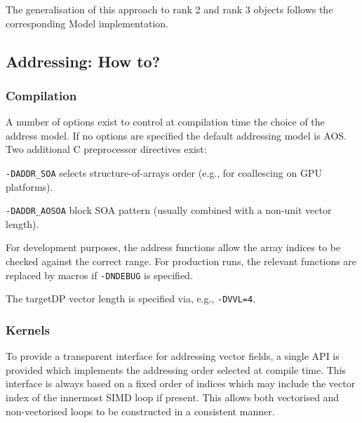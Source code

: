 The generalisation of this approach to rank 2 and rank 3 objects 
follows the corresponding Model implementation.

\subsection{Addressing: How to?}
\label{subsection:addressing-how-to}

\subsubsection{Compilation}

A number of options exist to control at compilation time the choice
of the address model. If no options are specified the default
addressing model is AOS. Two additional C preprocessor directives
exist:

\texttt{-DADDR\_SOA} selects structure-of-arrays order (e.g., for
coallescing on GPU platforms).

\texttt{-DADDR\_AOSOA} block SOA pattern (usually combined with
a non-unit vector length).

For development purposes, the address functions allow the array indices
to be checked against the correct range. For production runs, the
relevant functions are replaced by macros if \texttt{-DNDEBUG} is
specified.

The targetDP vector length is specified via, e.g.,  \texttt{-DVVL=4}.

\subsubsection{Kernels}

To provide a transparent interface for addressing vector fields,
a single API is provided which implements the addressing order
selected at compile time. This interface is always based
on a fixed order of indices which may include the
vector index of the innermost SIMD loop if present. This
allows both vectorised and non-vectorised loops to be constructed
in a consistent manner.

